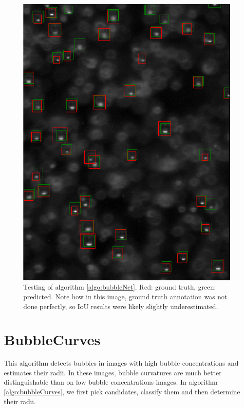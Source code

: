 			\begin{figure}
				\centering
				\includegraphics[scale=0.4]{images/bubbleNet_validation_result.png}
				\caption{Testing of algorithm \ref{algo:bubbleNet}. Red: ground truth, green: predicted. Note how in this image, ground truth annotation was not done perfectly, so IoU results were likely slightly underestimated.}
				\label{fig:bubbleNet_result}
			\end{figure}
	
	
	
	
	
	
	\section{BubbleCurves}\label{BubbleCurves}
		This algorithm detects bubbles in images with high bubble concentrations and estimates their radii. In these images, bubble curvatures are much better distinguishable than on low bubble concentrations images. In algorithm \ref{algo:bubbleCurves}, we first pick candidates, classify them and then determine their radii.
	

